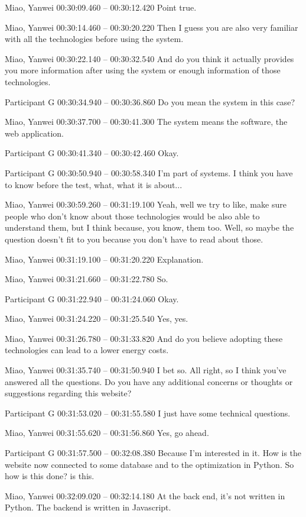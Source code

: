 {Miao, Yanwei 00:30:09.460 -- 00:30:12.420
Point true.

Miao, Yanwei 00:30:14.460 -- 00:30:20.220
Then I guess you are also very familiar with all the technologies before using the system.

Miao, Yanwei 00:30:22.140 -- 00:30:32.540
And do you think it actually provides you more information after using the system or enough information of those technologies.

Participant G 00:30:34.940 -- 00:30:36.860
Do you mean the system in this case?

Miao, Yanwei 00:30:37.700 -- 00:30:41.300
The system means the software, the web application.

Participant G 00:30:41.340 -- 00:30:42.460
Okay.

Participant G 00:30:50.940 -- 00:30:58.340
I'm part of systems. I think you have to know before the test, what, what it is about...

Miao, Yanwei 00:30:59.260 -- 00:31:19.100
Yeah, well we try to like, make sure people who don't know about those technologies would be also able to understand them, but I think because, you know, them too. Well, so maybe the question doesn't fit to you because you don't have to read about those.

Miao, Yanwei 00:31:19.100 -- 00:31:20.220
Explanation.

Miao, Yanwei 00:31:21.660 -- 00:31:22.780
So.

Participant G 00:31:22.940 -- 00:31:24.060
Okay.

Miao, Yanwei 00:31:24.220 -- 00:31:25.540
Yes, yes.

Miao, Yanwei 00:31:26.780 -- 00:31:33.820
And do you believe adopting these technologies can lead to a lower energy costs.

Miao, Yanwei 00:31:35.740 -- 00:31:50.940
I bet so. All right, so I think you've answered all the questions. Do you have any additional concerns or thoughts or suggestions regarding this website?

Participant G 00:31:53.020 -- 00:31:55.580
I just have some technical questions.

Miao, Yanwei 00:31:55.620 -- 00:31:56.860
Yes, go ahead.

Participant G 00:31:57.500 -- 00:32:08.380
Because I'm interested in it. How is the website now connected to some database and to the optimization in Python. So how is this done? is this.

Miao, Yanwei 00:32:09.020 -- 00:32:14.180
At the back end, it's not written in Python. The backend is written in Javascript.

}
